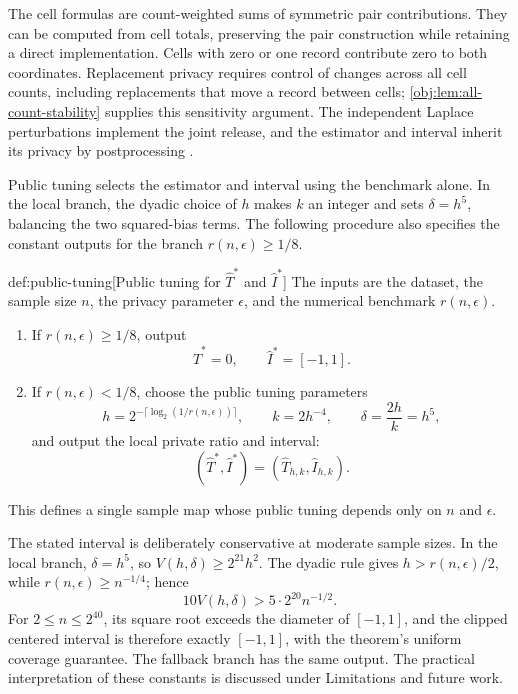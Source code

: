 \documentclass[11pt]{article}
\begin{document}
The cell formulas are count-weighted sums of symmetric pair contributions. They can be computed from cell totals, preserving the pair construction while retaining a direct implementation. Cells with zero or one record contribute zero to both coordinates. Replacement privacy requires control of changes across all cell counts, including replacements that move a record between cells; \cref{obj:lem:all-count-stability} supplies this sensitivity argument. The independent Laplace perturbations implement the joint release, and the estimator and interval inherit its privacy by postprocessing \citep{Dwork2006,Dwork2014}.

Public tuning selects the estimator  and interval  using the benchmark alone. In the local branch, the dyadic choice of \(h\) makes \(k\) an integer and sets \(\delta=h^5\), balancing the two squared-bias terms. The following procedure also specifies the constant outputs for the branch \(r(n,\epsilon)\ge1/8\).
\begin{algorithmv}{def:public-tuning}[Public tuning for \(\widehat T^*\) and \(\widehat I^*\)]
The inputs are the dataset, the sample size \(n\), the privacy parameter \(\epsilon\), and the numerical benchmark \(r(n,\epsilon)\).
\begin{enumerate}
\item If \(r(n,\epsilon)\ge1/8\), output
\[
\widehat T^*=0,
\qquad
\widehat I^*=[-1,1].
\]

\item If \(r(n,\epsilon)<1/8\), choose the public tuning parameters
\[
h=2^{-\lceil\log_2(1/r(n,\epsilon))\rceil},
\qquad
k=2h^{-4},
\qquad
\delta=\frac{2h}{k}=h^5,
\]
and output the local private ratio and interval:
\[
(\widehat T^*,\widehat I^*)
=
(\widehat T_{h,k},\widehat I_{h,k}).
\]
\end{enumerate}
This defines a single sample map whose public tuning depends only on \(n\) and \(\epsilon\).
\end{algorithmv}

The stated interval is deliberately conservative at moderate sample sizes. In the local branch, \(\delta=h^5\), so \(V(h,\delta)\ge 2^{21}h^2\). The dyadic rule gives \(h>r(n,\epsilon)/2\), while \(r(n,\epsilon)\ge n^{-1/4}\); hence
\[
10V(h,\delta)>5\cdot 2^{20}n^{-1/2}.
\]
For \(2\le n\le 2^{40}\), its square root exceeds the diameter of \([-1,1]\), and the clipped centered interval is therefore exactly \([-1,1]\), with the theorem's uniform coverage guarantee. The fallback branch has the same output. The practical interpretation of these constants is discussed under Limitations and future work.
\end{document}
